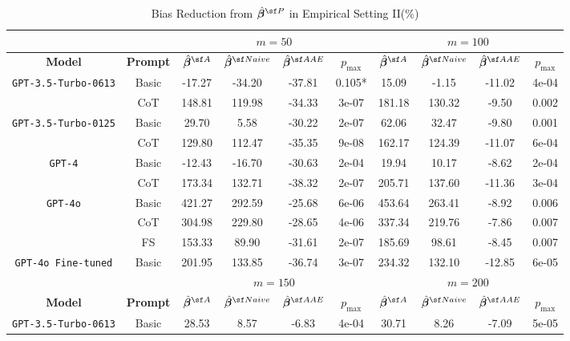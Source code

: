 \begin{table}[!t]
\renewcommand{\arraystretch}{1.3}
\centering
{\footnotesize
\caption{Bias Reduction from $\hat{\betavec}^{\sf P}$ in Empirical Setting II(\%)}
\label{tab:bias-reduction-2}
\begin{tabular}{cccccccccc}\hline\hline
& & \multicolumn{4}{c}{$m=50$} & \multicolumn{4}{c}{$m=100$} \\\hline
\textbf{Model}  & \textbf{Prompt} & $\hat{\betavec}^{\sf A}$ & $\hat{\betavec}^{\sf Naive}$  & $\hat{\betavec}^{\sf AAE}$  & $p_{\max}$ & $\hat{\betavec}^{\sf A}$ & $\hat{\betavec}^{\sf Naive}$  & $\hat{\betavec}^{\sf AAE}$   & $p_{\max}$ \\\hline
\multirow{2}{*}{\texttt{GPT-3.5-Turbo-0613}} & Basic & -17.27 & -34.20 & -37.81 & 0.105* & 15.09 & -1.15 & -11.02 & 4e-04 \\
 & CoT & 148.81 & 119.98 & -34.33 & 3e-07 & 181.18 & 130.32 & -9.50 & 0.002 \\
\multirow{2}{*}{\texttt{GPT-3.5-Turbo-0125}} & Basic & 29.70 & 5.58 & -30.22 & 2e-07 & 62.06 & 32.47 & -9.80 & 0.001 \\
 & CoT & 129.80 & 112.47 & -35.35 & 9e-08 & 162.17 & 124.39 & -11.07 & 6e-04 \\
\multirow{2}{*}{\texttt{GPT-4}} & Basic & -12.43 & -16.70 & -30.63 & 2e-04 & 19.94 & 10.17 & -8.62 & 2e-04 \\
 & CoT & 173.34 & 132.71 & -38.32 & 2e-07 & 205.71 & 137.60 & -11.36 & 3e-04 \\
\multirow{3}{*}{\texttt{GPT-4o}} & Basic & 421.27 & 292.59 & -25.68 & 6e-06 & 453.64 & 263.41 & -8.92 & 0.006 \\
 & CoT & 304.98 & 229.80 & -28.65 & 4e-06 & 337.34 & 219.76 & -7.86 & 0.007 \\
 & FS & 153.33 & 89.90 & -31.61 & 2e-07 & 185.69 & 98.61 & -8.45 & 0.007 \\
\texttt{GPT-4o Fine-tuned} & Basic & 201.95 & 133.85 & -36.74 & 3e-07 & 234.32 & 132.10 & -12.85 & 6e-05 \\\hline
& & \multicolumn{4}{c}{$m=150$} & \multicolumn{4}{c}{$m=200$} \\\hline
\textbf{Model}  & \textbf{Prompt} & $\hat{\betavec}^{\sf A}$ & $\hat{\betavec}^{\sf Naive}$  & $\hat{\betavec}^{\sf AAE}$  & $p_{\max}$ & $\hat{\betavec}^{\sf A}$ & $\hat{\betavec}^{\sf Naive}$  & $\hat{\betavec}^{\sf AAE}$   & $p_{\max}$ \\\hline
\multirow{2}{*}{\texttt{GPT-3.5-Turbo-0613}} & Basic & 28.53 & 8.57 & -6.83 & 4e-04 & 30.71 & 8.26 & -7.09 & 5e-05 \\

\end{tabular}}
\end{table}
